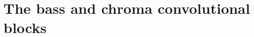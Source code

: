 \section{The bass and chroma convolutional blocks}
\label{sec:the_bass_and_chroma_convolutional_blocks}

